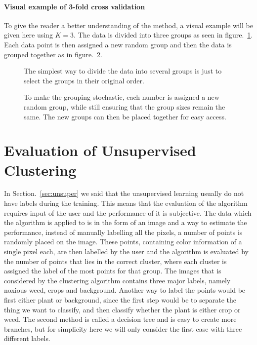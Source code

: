 \paragraph{Visual example of 3-fold cross validation}

To give the reader a better understanding of the method, a visual example will be given here using $K=3$. The data is divided into three groups as seen in figure.~\ref{fig:dartWheel}. Each data point is then assigned a new random group and then the data is grouped together as in figure.~\ref{fig:randomWheel}.

\begin{figure}[H]
    \centering
    
    \caption{\label{fig:dartWheel} The simplest way to divide the data into several groups is just to select the groups in their original order.}
\end{figure}

\begin{figure}[H]
\centering


\caption{\label{fig:randomWheel} To make the grouping stochastic, each number is assigned a new random group, while still ensuring that the group sizes remain the same. The new groups can then be placed together for easy access.}
\end{figure}

\section{Evaluation of Unsupervised Clustering}

\label{sec:unsupervised_method}

In Section.~\ref{sec:unsuper} we said that the unsupervised learning usually do not have labels during the training. This means that the evaluation of the algorithm requires input of the user and the performance of it is subjective. The data which the algorithm is applied to is in the form of an image and a way to estimate the performance, instead of manually labelling all the pixels, a number of points is randomly placed on the image. These points, containing color information of a single pixel each, are then labelled by the user and the algorithm is evaluated by the number of points that lies in the correct cluster, where each cluster is assigned the label of the most points for that group. The images that is considered by the clustering algorithm contains three major labels, namely noxious weed, crops and background. Another way to label the points would be first either plant or background, since the first step would be to separate the thing we want to classify, and then classify whether the plant is either crop or weed. The second method is called a decision tree and is easy to create more branches, but for simplicity here we will only consider the first case with three different labels. \\

